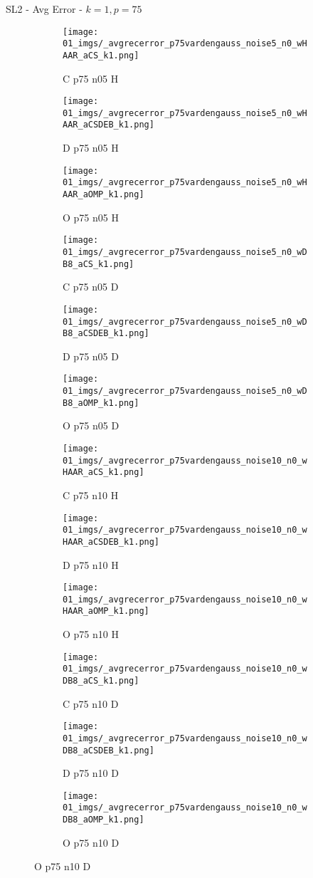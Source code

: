 \begin{frame}{SL2 - Avg Error - $k=1,p=75$}{}
\begin{figure}
\begin{subfigure}{0.13\textwidth}
\texttt{[image: 01\_imgs/\_avgrecerror\_p75vardengauss\_noise5\_n0\_wHAAR\_aCS\_k1.png]}
\caption*{\tiny C p75 n05 H}
\end{subfigure}
\begin{subfigure}{0.13\textwidth}
\texttt{[image: 01\_imgs/\_avgrecerror\_p75vardengauss\_noise5\_n0\_wHAAR\_aCSDEB\_k1.png]}
\caption*{\tiny D p75 n05 H}
\end{subfigure}
\begin{subfigure}{0.13\textwidth}
\texttt{[image: 01\_imgs/\_avgrecerror\_p75vardengauss\_noise5\_n0\_wHAAR\_aOMP\_k1.png]}
\caption*{\tiny O p75 n05 H}
\end{subfigure}
\begin{subfigure}{0.13\textwidth}
\texttt{[image: 01\_imgs/\_avgrecerror\_p75vardengauss\_noise5\_n0\_wDB8\_aCS\_k1.png]}
\caption*{\tiny C p75 n05 D}
\end{subfigure}
\begin{subfigure}{0.13\textwidth}
\texttt{[image: 01\_imgs/\_avgrecerror\_p75vardengauss\_noise5\_n0\_wDB8\_aCSDEB\_k1.png]}
\caption*{\tiny D p75 n05 D}
\end{subfigure}
\begin{subfigure}{0.13\textwidth}
\texttt{[image: 01\_imgs/\_avgrecerror\_p75vardengauss\_noise5\_n0\_wDB8\_aOMP\_k1.png]}
\caption*{\tiny O p75 n05 D}
\end{subfigure}

\vspace{5pt}

\begin{subfigure}{0.13\textwidth}
\texttt{[image: 01\_imgs/\_avgrecerror\_p75vardengauss\_noise10\_n0\_wHAAR\_aCS\_k1.png]}
\caption*{\tiny C p75 n10 H}
\end{subfigure}
\begin{subfigure}{0.13\textwidth}
\texttt{[image: 01\_imgs/\_avgrecerror\_p75vardengauss\_noise10\_n0\_wHAAR\_aCSDEB\_k1.png]}
\caption*{\tiny D p75 n10 H}
\end{subfigure}
\begin{subfigure}{0.13\textwidth}
\texttt{[image: 01\_imgs/\_avgrecerror\_p75vardengauss\_noise10\_n0\_wHAAR\_aOMP\_k1.png]}
\caption*{\tiny O p75 n10 H}
\end{subfigure}
\begin{subfigure}{0.13\textwidth}
\texttt{[image: 01\_imgs/\_avgrecerror\_p75vardengauss\_noise10\_n0\_wDB8\_aCS\_k1.png]}
\caption*{\tiny C p75 n10 D}
\end{subfigure}
\begin{subfigure}{0.13\textwidth}
\texttt{[image: 01\_imgs/\_avgrecerror\_p75vardengauss\_noise10\_n0\_wDB8\_aCSDEB\_k1.png]}
\caption*{\tiny D p75 n10 D}
\end{subfigure}
\begin{subfigure}{0.13\textwidth}
\texttt{[image: 01\_imgs/\_avgrecerror\_p75vardengauss\_noise10\_n0\_wDB8\_aOMP\_k1.png]}
\caption*{\tiny O p75 n10 D}
\end{subfigure}


\end{figure}
\end{frame}
